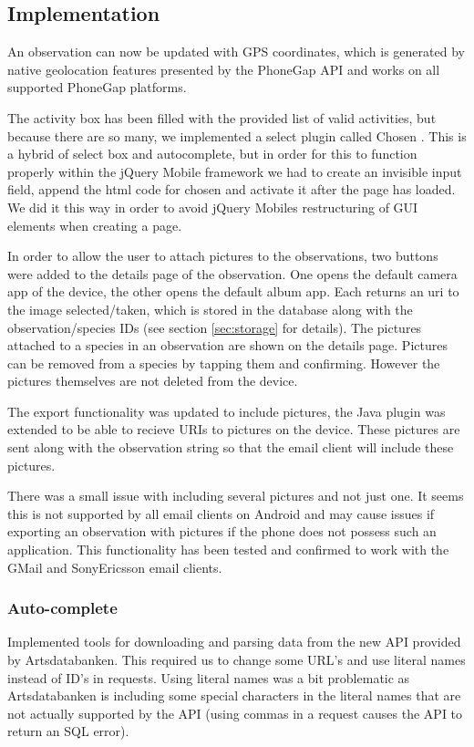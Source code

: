 \subsection{Implementation}
An observation can now be updated with GPS coordinates, which is generated by
native geolocation features presented by the PhoneGap API and works on all
supported PhoneGap platforms.

The activity box has been filled with the provided list of valid activities, but
because there are so many, we implemented a select plugin called Chosen
\cite{library:chosen}. This is a hybrid of select box and autocomplete, but in
order for this to function properly within the jQuery Mobile framework we had to
create an invisible input field, append the html code for chosen and activate it
after the page has loaded. We did it this way in order to avoid jQuery Mobiles
restructuring of GUI elements when creating a page.

In order to allow the user to attach pictures to the observations, two buttons
were added to the details page of the observation. One opens the default camera
app of the device, the other opens the default album app. Each returns an uri to
the image selected/taken, which is stored in the database along with the
observation/species IDs (see section \ref{sec:storage} for details). The
pictures attached to a species in an observation are shown on the details page.
Pictures can be removed from a species by tapping them and confirming. However
the pictures themselves are not deleted from the device.

The export functionality was updated to include pictures, the Java plugin was
extended to be able to recieve URIs to pictures on the device.  These pictures
are sent along with the observation string so that the email client will include
these pictures.

There was a small issue with including several pictures and not just
one.  It seems this is not supported by all email clients on Android and may
cause issues if exporting an observation with pictures if the phone does not
possess such an application.  This functionality has been tested and confirmed
to work with the GMail and SonyEricsson email clients.

	\subsubsection{Auto-complete}

  Implemented tools for downloading and parsing data from the new API provided
  by Artsdatabanken. This required us to change some URL's and use literal names
  instead of ID's in requests. Using literal names was a bit problematic as
  Artsdatabanken is including some special characters in the literal names that
  are not actually supported by the API (using commas in a request causes the API
  to return an SQL error).

